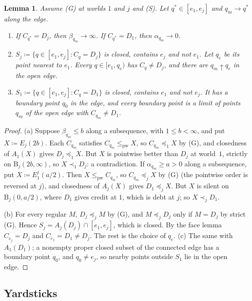 \documentclass[11pt]{article}
\newtheorem{lemma}[theorem]{Lemma}
\theoremstyle{definition}\newtheorem{definition}[theorem]{Definition}
\theoremstyle{remark}\newtheorem{remark}[theorem]{Remark}
\newcommand{\Band}{\mathrm{B}}
\begin{document}
\begin{lemma}\label{lem:ends}
Assume (G) at worlds $1$ and $j$ and (S). Let $q^*\in[e_1,e_j]$ and
$q_m\to q^*$ along the edge.
\begin{enumerate}[label=(\alph*)]
\item If $C_{q^*}=D_j$, then $\beta_{q_m}\to\infty$. If $C_{q^*}=D_1$, then
$\alpha_{q_m}\to0$.
\item $S_j\coloneqq\{q\in[e_1,e_j]:C_q=D_j\}$ is closed, contains $e_j$ and
not $e_1$. Let $q_e$ be its point nearest to $e_1$. Every $q\in[e_1,q_e)$
has $C_q\ne D_j$, and there are $q_m\uparrow q_e$ in the open edge.
\item $S_1\coloneqq\{q\in[e_1,e_j]:C_q=D_1\}$ is closed, contains $e_1$ and
not $e_j$. It has a boundary point $q_0$ in the edge, and every boundary
point is a limit of points $q_m$ of the open edge with $C_{q_m}\ne D_1$.
\end{enumerate}
\end{lemma}
\begin{proof}
(a) Suppose $\beta_{q_m}\le b$ along a subsequence, with $1\le b<\infty$, and
put $X\coloneqq E_j(2b)$. Each $C_{q_m}$ satisfies $C_{q_m}\le_{\mathrm{pw}}X$,
so $C_{q_m}\preceq_1X$ by (G), and closedness of $A_1(X)$ gives
$D_j\preceq_1X$. But $X$ is pointwise better than $D_j$ at world~$1$,
strictly on $\Band_j(2b,\infty)$, so $X\prec_1D_j$: a contradiction. If
$\alpha_{q_m}\ge a>0$ along a subsequence, put $X\coloneqq E^j_1(a/2)$. Then
$X\le_{\mathrm{pw}}C_{q_m}$, so $C_{q_m}\preceq_jX$ by (G) (the pointwise order
is reversed at $j$), and closedness of $A_j(X)$ gives $D_1\preceq_jX$. But
$X$ is silent on $\Band_j(0,a/2)$, where $D_1$ gives credit at $1$, which is
debt at $j$; so $X\prec_jD_1$.

(b) For every regular $M$, $D_j\preceq_jM$ by (G), and $M\preceq_jD_j$ only
if $M=D_j$ by strict (G). Hence $S_j=A_j(D_j)\cap[e_1,e_j]$, which is closed.
By the face lemma $C_{e_j}=D_j$ and $C_{e_1}=D_1\ne D_j$. The rest is the
choice of $q_e$. (c) The same with $A_1(D_1)$; a nonempty proper closed subset
of the connected edge has a boundary point $q_0$, and $q_0\ne e_j$, so
nearby points outside $S_1$ lie in the open edge.
\end{proof}

\subsection{Yardsticks}
\end{document}
